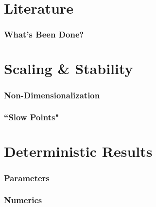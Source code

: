 \documentclass{beamer}   %
\begin{document}

\section{Literature}

\begin{frame}
    \frametitle{What's Been Done?}

\end{frame}



\section{Scaling \& Stability}

\begin{frame}
    \frametitle{Non-Dimensionalization}

\end{frame}





\begin{frame}
    \frametitle{``Slow Points"}

\end{frame}



\section{Deterministic Results}


\begin{frame}
    \frametitle{Parameters}

\end{frame}




\begin{frame}
    \frametitle{Numerics}

\end{frame}
\end{document}
